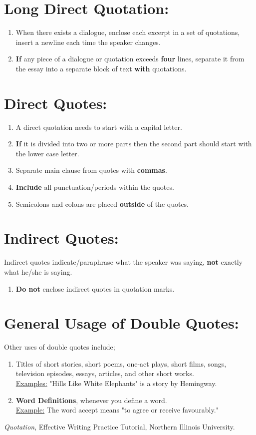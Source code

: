 \documentclass[12pt]{article} %
\begin{document}
\section*{Long Direct Quotation:}
\begin{enumerate}
  \item When there exists a dialogue, enclose each excerpt in a set of quotations, insert a newline each time the speaker
  changes.
  \item \textbf{If} any piece of a dialogue or quotation exceeds \textbf{four} lines, separate it from the essay into a
  separate block of text \textbf{with} quotations.
\end{enumerate}

\section*{Direct Quotes:}
\begin{enumerate}
  \item A direct quotation needs to start with a capital letter.
  \item \textbf{If} it is divided into two or more parts then the second part should start with the lower case letter.
  \item Separate main clause from quotes with \textbf{commas}.
  \item \textbf{Include} all punctuation/periods within the quotes.
  \item Semicolons and colons are placed \textbf{outside} of the quotes.
\end{enumerate}

\section*{Indirect Quotes:}
Indirect quotes indicate/paraphrase what the speaker was saying, \textbf{not} exactly what he/she is saying.
\begin{enumerate}
  \item \textbf{Do not} enclose indirect quotes in quotation marks.
\end{enumerate}

\newpage

\section*{General Usage of Double Quotes:}
Other uses of double quotes include; 
  \begin{enumerate}
    \item Titles of short stories, short poems, one-act plays, short films, songs,
    television episodes, essays, articles, and other short works.\\
    \underline{Examples:} "Hills Like White Elephants" is a story by Hemingway.

    \item \textbf{Word Definitions}, whenever you define a word.\\
    \underline{Example:} The word accept means "to agree or receive favourably."
  \end{enumerate}



  

  


\vspace*{2cm}




\textit{Quotation}, Effective Writing Practice Tutorial, Northern Illinois University.\\
\end{document}
